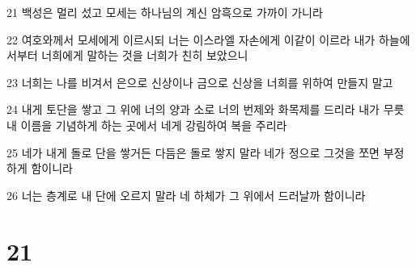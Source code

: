 \par 21 백성은 멀리 섰고 모세는 하나님의 계신 암흑으로 가까이 가니라
\par 22 여호와께서 모세에게 이르시되 너는 이스라엘 자손에게 이같이 이르라 내가 하늘에서부터 너희에게 말하는 것을 너희가 친히 보았으니
\par 23 너희는 나를 비겨서 은으로 신상이나 금으로 신상을 너희를 위하여 만들지 말고
\par 24 내게 토단을 쌓고 그 위에 너의 양과 소로 너의 번제와 화목제를 드리라 내가 무릇 내 이름을 기념하게 하는 곳에서 네게 강림하여 복을 주리라
\par 25 네가 내게 돌로 단을 쌓거든 다듬은 돌로 쌓지 말라 네가 정으로 그것을 쪼면 부정하게 함이니라
\par 26 너는 층계로 내 단에 오르지 말라 네 하체가 그 위에서 드러날까 함이니라

\chapter{21}

